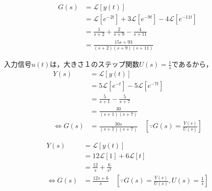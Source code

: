 \documentclass[a4paper,12pt]{article}
\begin{document}
\begin{tcolorbox}[title={[22] 単位インパルス応答が\(y(t)=e^{-2t}+3e^{-9t}-4e^{-11t}\)であるとき，\\
    \qquad このシステムの伝達関数を求めよ． }]

    \begin{align*}
        G(s)
        &= \mathcal{L} \left[ y(t) \right] \\
        &= \mathcal{L} \left[ e^{-2t} \right]+3 \mathcal{L} \left[ e^{-9t} \right]-4 \mathcal{L} \left[ e^{-11t} \right]\\
        &= \frac{1}{s+2} + \frac{2}{s+9} - \frac{4}{s+11}\\
        &= \frac{15s+93}{(s+2)(s+9)(s+11)}
    \end{align*}

\end{tcolorbox}
\begin{tcolorbox}[title={[23] 単位ステップ応答が\(y(t)=5e^{-t}-5e^{-7t}\)であるとき，\\
    \qquad このシステムの伝達関数を求めよ． }]

    \qquad 入力信号\(u(t)\)は，大きさ１のステップ関数\(U(s)=\frac{1}{s}\)であるから，
    \begin{align*}
        Y(s)
        &= \mathcal{L} \left[ y(t) \right] \\
        &= 5\mathcal{L} \left[ e^{-t} \right]-5 \mathcal{L} \left[ e^{-7t} \right]\\
        &= \frac{5}{s+1} - \frac{5}{s+7} \\
        &= \frac{30}{(s+1)(s+7)}\\
        \Leftrightarrow G(s) &= \frac{30s}{(s+1)(s+7)} \quad [\because G(s)=\frac{Y(s)}{U(s)}]
    \end{align*}



\vspace{2mm}
\end{tcolorbox}
\begin{tcolorbox}[title={[24] 単位ステップ応答が\(y(t)=12+6t\)であるとき，\\
    \qquad このシステムの伝達関数を求めよ． }]

    \begin{align*}
        Y(s)
        &= \mathcal{L} \left[ y(t) \right] \\
        &= 12\mathcal{L} \left[ 1 \right]+6 \mathcal{L} \left[ t \right]\\
        &= \frac{12}{s} + \frac{6}{s^2} \\
        \Leftrightarrow G(s) &= \frac{12s+6}{s} \quad [\because G(s)=\frac{Y(s)}{U(s)},U(s)=\frac{1}{s}]
    \end{align*}
\end{tcolorbox}
\end{document}
